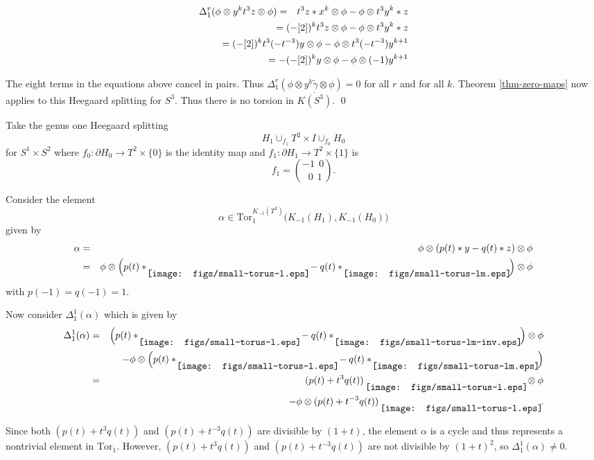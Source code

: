 \documentclass{slides}
\newcommand{\ot}{\otimes}
\newcommand{\torusL}{\raisebox{-7pt}{\mbox{}\hspace{-5pt}
                  \texttt{[image: figs/small-torus-l.eps]}\hspace{-2pt}\mbox{}}}
\newcommand{\torusLM}{\raisebox{-7pt}{\mbox{}\hspace{-5pt}
                  \texttt{[image: figs/small-torus-lm.eps]}\hspace{-2pt}\mbox{}}}
\newcommand{\torusLMinv}{\raisebox{-7pt}{\mbox{}\hspace{-5pt}
                  \texttt{[image: figs/small-torus-lm-inv.eps]}\hspace{-2pt}\mbox{}}}
\begin{document}
\begin{slide}
\begin{eqnarray}
\Delta^r_1(\phi \ot y^k t^3 z \ot \phi) & = &
t^3 z * x^k \ot \phi - \phi \ot t^3 y^k * z \nonumber \\
& & \hspace{-6cm} = (-[2])^k t^3 z \ot \phi - \phi \ot t^3 y^k * z \nonumber \\
& & \hspace{-6cm} = (-[2])^k t^3 (-t^{-3}) y \ot \phi -
\phi \ot t^3 (-t^{-3}) y^{k+1} \nonumber \\
& & \hspace{-6cm} = -(-[2])^k y \ot \phi - \phi \ot (-1) y^{k+1} \nonumber
\end{eqnarray}

The eight terms in the equations above
cancel in pairs.  Thus $\Delta^r_1(\phi \ot y^k \tilde{\gamma} \ot \phi) = 0$
for all $r$ and for all $k$.  Theorem \ref{thm-zero-maps} now applies to this Heegaard
splitting for $S^3$.  Thus there is no torsion in $\overline{K(S^3)}$.
\qed
\end{slide}

\begin{slide}
Take the genus one Heegaard splitting
$$H_1 \cup_{f_1} T^2 \times I \cup_{f_0} H_0$$ for $S^1 \times S^2$ where
$f_0 : \partial H_0 \to T^2 \times \{0\}$ is the identity
map and
$f_1 : \partial H_1 \to T^2 \times \{1\}$ is
$$f_1 = \binom{-1~~0}{~~0~~1}.$$

Consider the element $$\alpha \in
\mathrm{Tor}_1^{K_{-1}(T^2)} \Big( K_{-1}(H_1), K_{-1}(H_0) \Big)$$ given by
\begin{eqnarray}
\alpha & = & \phi \ot (p(t)*y - q(t)*z) \ot \phi \nonumber \\
& = & \phi \ot \Big( p(t)*\torusL - q(t)*\torusLM \Big) \ot \phi \nonumber
\end{eqnarray}
with $p(-1) = q(-1) = 1$.
\end{slide}

\begin{slide}
Now consider $\Delta^1_1(\alpha)$ which is given by
\begin{eqnarray}
\Delta^1_1(\alpha) & = & \Big( p(t)*\torusL - q(t)*\torusLMinv \Big) \ot
\phi \nonumber \\
& & - \phi \ot \Big( p(t)*\torusL - q(t)*\torusLM \Big) \nonumber \\
& = & (p(t)+t^3q(t))~\torusL \ot \phi \nonumber \\
& & - \phi \ot (p(t)+t^{-3}q(t))~\torusL. \nonumber
\end{eqnarray}

Since both $(p(t)+t^3q(t))$ and $(p(t)+t^{-3}q(t))$ are divisible by $(1+t)$, the
element $\alpha$ is a cycle and thus represents a nontrivial element in
$\mathrm{Tor}_1$.  However, $(p(t)+t^3q(t))$ and $(p(t)+t^{-3}q(t))$ are
not divisible by $(1+t)^2$, so $\Delta^1_1(\alpha) \neq 0$.
\end{slide}
\end{document}
